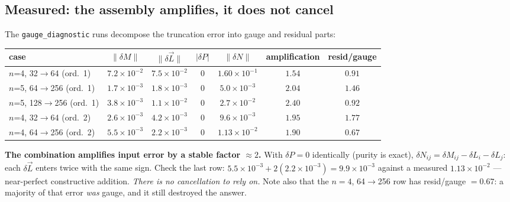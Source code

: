 \documentclass[11pt,a4paper]{article}
\begin{document}
\subsection{Measured: the assembly amplifies, it does not cancel}
The \texttt{gauge\_diagnostic} runs decompose the truncation error into gauge and residual parts:
\begin{center}\small
\begin{tabular}{@{}lcccccc@{}}
\toprule
case & $\|\delta M\|$ & $\|\delta\vec L\|$ & $|\delta P|$ & $\|\delta N\|$ & amplification & resid/gauge\\
\midrule
$n$=4, 32$\to$64 (ord.\ 1) & $7.2\times10^{-2}$ & $7.5\times10^{-2}$ & $0$ & $1.60\times10^{-1}$ & $1.54$ & $0.91$\\
$n$=5, 64$\to$256 (ord.\ 1) & $1.7\times10^{-3}$ & $1.8\times10^{-3}$ & $0$ & $5.0\times10^{-3}$ & $2.04$ & $1.46$\\
$n$=5, 128$\to$256 (ord.\ 1) & $3.8\times10^{-3}$ & $1.1\times10^{-2}$ & $0$ & $2.7\times10^{-2}$ & $2.40$ & $0.92$\\
$n$=4, 32$\to$64 (ord.\ 2) & $2.6\times10^{-3}$ & $4.2\times10^{-3}$ & $0$ & $9.6\times10^{-3}$ & $1.95$ & $1.77$\\
$n$=4, 64$\to$256 (ord.\ 2) & $5.5\times10^{-3}$ & $2.2\times10^{-3}$ & $0$ & $1.13\times10^{-2}$ & $1.90$ & $0.67$\\
\bottomrule
\end{tabular}
\end{center}
\textbf{The combination amplifies input error by a stable factor ${\approx}2$.} With
$\delta P=0$ identically (purity is exact), $\delta N_{ij}=\delta M_{ij}-\delta L_i-\delta L_j$:
each $\delta\vec L$ enters twice with the same sign. Check the last row:
$5.5\times10^{-3}+2(2.2\times10^{-3})=9.9\times10^{-3}$ against a measured $1.13\times10^{-2}$
--- near-perfect constructive addition. \emph{There is no cancellation to rely on.}
Note also that the $n=4$, 64$\to$256 row has resid/gauge $=0.67$: a majority of that error
\emph{was} gauge, and it still destroyed the answer.
\end{document}
